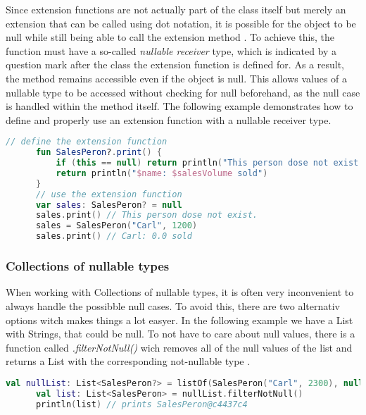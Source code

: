\documentclass[a4paper, 11pt]{article}
\begin{document}
    Since extension functions are not actually part of the class itself but merely an extension that can be called using dot notation, it is possible for the object to be null while still being able to call the extension method \cite{nullsafety-nullable-receiver}. To achieve this, the function must have a so-called \textit{nullable receiver} type, which is indicated by a question mark after the class the extension function is defined for. As a result, the method remains accessible even if the object is null. This allows values of a nullable type to be accessed without checking for null beforehand, as the null case is handled within the method itself. The following example demonstrates how to define and properly use an extension function with a nullable receiver type.
    \begin{lstlisting}[language=Kotlin,title={Usage of an extension function}]
      // define the extension function
      fun SalesPeron?.print() {
          if (this == null) return println("This person dose not exist.")
          return println("$name: $salesVolume sold")
      }
      // use the extension function
      var sales: SalesPeron? = null
      sales.print() // This person dose not exist.
      sales = SalesPeron("Carl", 1200)
      sales.print() // Carl: 0.0 sold
    \end{lstlisting}

  \subsubsection{Collections of nullable types}
    When working with Collections of nullable types, it is often very inconvenient to always handle the possibble null cases. To avoid this, there are two alternativ options witch makes things a lot easyer.
    In the following example we have a List with Strings, that could be null. To not have to care about null values, there is a function called \textit{.filterNotNull()} wich removes all of the null values of the list and returns a List with the corresponding not-nullable type \cite{nullsafety-collections}.
    \begin{lstlisting}[language=Kotlin]
      val nullList: List<SalesPeron?> = listOf(SalesPeron("Carl", 2300), null)
      val list: List<SalesPeron> = nullList.filterNotNull()
      println(list) // prints SalesPeron@c4437c4
    \end{lstlisting}
\end{document}
